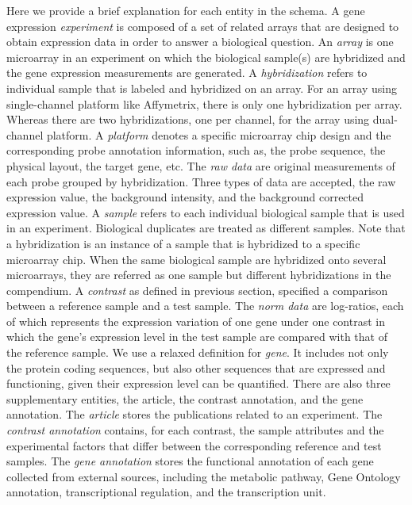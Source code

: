 Here we provide a brief explanation for each entity in the schema.
%
A gene expression \textit{experiment} is composed of a set of related arrays
that are designed to obtain expression data in order to answer a biological
question.
%
An \textit{array} is one microarray in an experiment on which the biological
sample(s) are hybridized and the gene expression measurements are generated.
%
A \textit{hybridization} refers to individual sample that is labeled and
hybridized on an array.
%
For an array using single-channel platform like Affymetrix, there is only one
hybridization per array.  Whereas there are two hybridizations, one per
channel, for the array using dual-channel platform.
%
A \textit{platform} denotes a specific microarray chip design and the
corresponding probe annotation information, such as, the probe sequence, the
physical layout, the target gene, etc.
%
The \textit{raw data} are original measurements of each probe grouped by
hybridization.  Three types of data are accepted, the raw expression value,
the background intensity, and the background corrected expression value.
%
A \textit{sample} refers to each individual biological sample that is used in
an experiment.  Biological duplicates are treated as different samples.
%
Note that a hybridization is an instance of a sample that is hybridized to a
specific microarray chip.  When the same biological sample are hybridized
onto several microarrays, they are referred as one sample but different
hybridizations in the compendium.
%
A \textit{contrast} as defined in previous section, specified a comparison
between a reference sample and a test sample.
%
The \textit{norm data} are log-ratios, each of which represents the expression
variation of one gene under one contrast in which the gene's expression level
in the test sample are compared with that of the reference sample.
%
We use a relaxed definition for \textit{gene}. It includes not only the protein
coding sequences, but also other sequences that are expressed and functioning,
given their expression level can be quantified.
%
There are also three supplementary entities, the article, the contrast
annotation, and the gene annotation.
%
The \textit{article} stores the publications related to an experiment.
%
The \textit{contrast annotation} contains, for each contrast, the sample
attributes and the experimental factors that differ between the corresponding
reference and test samples.
%
The \textit{gene annotation} stores the functional annotation of each gene
collected from external sources, including the metabolic pathway, Gene Ontology
annotation, transcriptional regulation, and the transcription unit.






